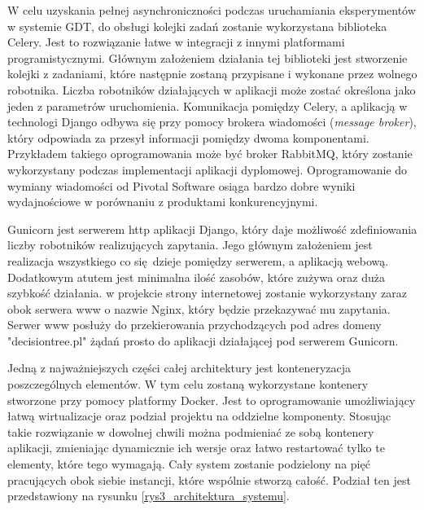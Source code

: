W celu uzyskania pełnej asynchroniczności podczas uruchamiania eksperymentów w systemie GDT, do obsługi kolejki zadań zostanie wykorzystana biblioteka Celery.\cite{misc_celery} Jest to rozwiązanie łatwe w integracji z innymi platformami programistycznymi. Głównym założeniem działania tej biblioteki jest stworzenie kolejki z zadaniami, które następnie zostaną przypisane i wykonane przez wolnego robotnika. Liczba robotników działających w aplikacji może zostać określona jako jeden z parametrów uruchomienia. Komunikacja pomiędzy Celery, a aplikacją w technologi Django odbywa się przy pomocy brokera wiadomości (\textit{message broker}), który odpowiada za przesył informacji pomiędzy dwoma komponentami. Przykładem takiego oprogramowania może być broker RabbitMQ, który zostanie wykorzystany podczas implementacji aplikacji dyplomowej.\cite{misc_rabbit} Oprogramowanie do wymiany wiadomości od Pivotal Software osiąga bardzo dobre wyniki wydajnościowe w porównaniu z produktami konkurencyjnymi.

Gunicorn jest serwerem http aplikacji Django, który daje możliwość zdefiniowania liczby robotników realizujących zapytania. Jego głównym założeniem jest realizacja wszystkiego co się dzieje pomiędzy serwerem, a aplikacją webową. Dodatkowym atutem jest minimalna ilość zasobów, które zużywa oraz duża szybkość działania.\cite{misc_gunicorn} w projekcie strony internetowej zostanie wykorzystany zaraz obok serwera www o nazwie Nginx, który będzie przekazywać mu zapytania. Serwer www posłuży do przekierowania przychodzących pod adres domeny "decisiontree.pl" żądań prosto do aplikacji działającej pod serwerem Gunicorn.

Jedną z najważniejszych części całej architektury jest konteneryzacja poszczególnych elementów. W tym celu zostaną wykorzystane kontenery stworzone przy pomocy platformy Docker. Jest to oprogramowanie umożliwiający łatwą wirtualizacje oraz podział projektu na oddzielne komponenty. \cite{misc_docker} Stosując takie rozwiązanie w dowolnej chwili można podmieniać ze sobą kontenery aplikacji, zmieniając dynamicznie ich wersje oraz łatwo restartować tylko te elementy, które tego wymagają. Cały system zostanie podzielony na pięć pracujących obok siebie instancji, które wspólnie stworzą całość. Podział ten jest przedstawiony na rysunku \ref{rys3_architektura_systemu}.


 
 





